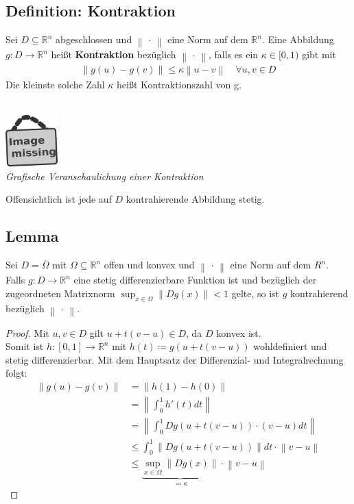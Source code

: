 \documentclass[ngerman,fontsize=11pt, paper=a4, parskip=half, titlepage=true, toc=bib]{scrbook}
\newcommand{\R}{\mathds{R}}
\newcommand{\nn}[1]{\left\| #1 \right\|}
\newcommand{\imagemissing}[1]{
	\begin{center}~\\
		\centering 
		\includegraphics[width=2cm]{images/image_missing.jpg}\\
		\textit{#1} \\
	\end{center}
}
\begin{document}
	\subsection{Definition: Kontraktion} 
	Sei $D\subseteq  \R^n $ abgeschlossen und $\nn{\,\cdot\,}$ eine Norm auf dem $\R^n$.
	Eine Abbildung $g:D\rightarrow \R^n $ heißt \textbf{Kontraktion} bezüglich  $\nn{\,\cdot\,}$,
	falls es ein $\kappa \in [0,1)$ gibt mit
	\begin{gather*}
		\nn{g(u)-g(v)} \leq \kappa \nn{u-v} \quad \forall u,v\in D
	\end{gather*}
	Die kleinste solche Zahl $\kappa$ heißt Kontraktionszahl von g.
	
	\imagemissing{Grafische Veranschaulichung einer Kontraktion}
	
	Offensichtlich ist jede auf $D$ kontrahierende Abbildung stetig.
	
	\subsection{Lemma} \label{5.2.3}
	Sei $D=\overline{\Omega} $ mit $\Omega \subseteq \R^n$ offen und konvex
	und $\nn{\,\cdot\,}$ eine Norm auf dem $R^n$.\\
	Falls $g:D\longrightarrow \R^n$ eine stetig differenzierbare Funktion ist und
	bezüglich der zugeordneten Matrixnorm $\sup_{x\in \Omega}\nn{Dg(x)}<1$ gelte,
	so ist $g$ kontrahierend bezüglich  $\nn{\,\cdot\,}$.
	
	\begin{proof}
		Mit $u,v \in D$ gilt $u+t(v-u)\in D$, da $D$ konvex ist. \\
		Somit ist $h:[0,1]\rightarrow \R^n $ mit $h(t) \coloneqq g(u+t(v-u))$ wohldefiniert
		und stetig differenzierbar. Mit dem Hauptsatz der Differenzial- und Integralrechnung
		folgt:
		\begin{align}\nonumber
			\nn{g(u)-g(v)} & = \nn{h(1)-h(0)}  \\ \nonumber
										& = \nn{\int_{0}^{1} h'(t) dt} \\ \nonumber
										& = \nn{\int_{0}^{1} Dg(u+t(v-u))\cdot (v-u)dt} \\ \nonumber
										& \leq \int_{0}^{1} \nn{Dg(u+t(v-u))}dt \cdot \nn{v-u} \\
										& \leq \underbrace{\sup_{x\in\Omega}\nn{Dg(x)}}_{\eqqcolon \kappa} 
										    \cdot \nn{v-u}
										    \label{V.2.4}
		\end{align}
	\end{proof}
	
\end{document}
